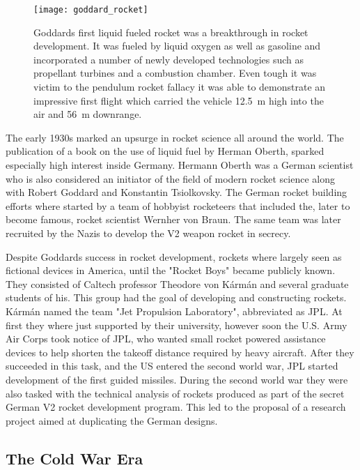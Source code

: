 \begin{figure}[H]
\centering
\texttt{[image: goddard\_rocket]}
\caption{Goddards first liquid fueled rocket was a breakthrough in rocket development. It was fueled by liquid oxygen as well as gasoline and incorporated a number of newly developed technologies such as propellant turbines and a combustion chamber. Even tough it was victim to the pendulum rocket fallacy it was able to demonstrate an impressive first flight which carried the vehicle \SI{12.5}{\meter} high into the air and \SI{56}{\meter} downrange.}
\end{figure}

The early 1930s marked an upsurge in rocket science all around the world. The publication of a book on the use of liquid fuel by Herman Oberth, sparked especially high interest inside Germany. Hermann Oberth was a German scientist who is also considered an initiator of the field of modern rocket science along with Robert Goddard and Konstantin Tsiolkovsky. The German rocket building efforts where started by a team of hobbyist rocketeers that included the, later to become famous, rocket scientist Wernher von Braun. The same team was later recruited by the Nazis to develop the V2 weapon rocket in secrecy.\cite{nasa-brief-history}

Despite Goddards success in rocket development, rockets where largely seen as fictional devices in America, until the "Rocket Boys" became publicly known. They consisted of Caltech professor Theodore von Kármán and several graduate students of his. This group had the goal of developing and constructing rockets. Kármán named the team "Jet Propulsion Laboratory", abbreviated as JPL. At first they where just supported by their university, however soon the U.S. Army Air Corps took notice of JPL, who wanted small rocket powered assistance devices to help shorten the takeoff distance required by heavy aircraft. After they succeeded in this task, and the US entered the second world war, JPL started development of the first guided missiles. During the second world war they were also tasked with the technical analysis of rockets produced as part of the secret German V2 rocket development program. This led to the proposal of a research project aimed at duplicating the German designs. \cite{jpl-history-beginning}

\subsection{The Cold War Era}

